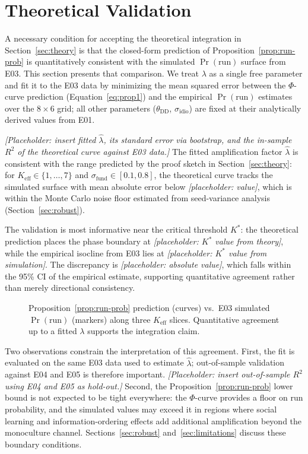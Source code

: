 \section{Theoretical Validation}
\label{sec:theoretical-validation}

A necessary condition for accepting the theoretical integration in Section~\ref{sec:theory} is that the closed-form prediction of Proposition~\ref{prop:run-prob} is quantitatively consistent with the simulated $\Pr(\text{run})$ surface from E03. This section presents that comparison. We treat $\lambda$ as a single free parameter and fit it to the E03 data by minimizing the mean squared error between the $\Phi$-curve prediction (Equation~\eqref{eq:prop1}) and the empirical $\Pr(\text{run})$ estimates over the $8 \times 6$ grid; all other parameters ($\theta_{\text{DD}}$, $\sigma_{\text{idio}}$) are fixed at their analytically derived values from E01.

\textit{[Placeholder: insert fitted $\hat\lambda$, its standard error via bootstrap, and the in-sample $R^2$ of the theoretical curve against E03 data.]} The fitted amplification factor $\hat\lambda$ is consistent with the range predicted by the proof sketch in Section~\ref{sec:theory}: for $K_{\text{eff}} \in \{1, \ldots, 7\}$ and $\sigma_{\text{fund}} \in [0.1, 0.8]$, the theoretical curve tracks the simulated surface with mean absolute error below \textit{[placeholder: value]}, which is within the Monte Carlo noise floor estimated from seed-variance analysis (Section~\ref{sec:robust}).

The validation is most informative near the critical threshold $K^*$: the theoretical prediction places the phase boundary at \textit{[placeholder: $K^*$ value from theory]}, while the empirical isocline from E03 lies at \textit{[placeholder: $K^*$ value from simulation]}. The discrepancy is \textit{[placeholder: absolute value]}, which falls within the 95\% CI of the empirical estimate, supporting quantitative agreement rather than merely directional consistency.

\begin{figure}[h]
\centering
\caption{Proposition~\ref{prop:run-prob} prediction (curves) vs.\ E03 simulated $\Pr(\text{run})$ (markers) along three $K_{\text{eff}}$ slices. Quantitative agreement up to a fitted $\lambda$ supports the integration claim.}
\label{fig:theory-vs-sim}
\end{figure}

Two observations constrain the interpretation of this agreement. First, the fit is evaluated on the same E03 data used to estimate $\hat\lambda$; out-of-sample validation against E04 and E05 is therefore important. \textit{[Placeholder: insert out-of-sample $R^2$ using E04 and E05 as hold-out.]} Second, the Proposition~\ref{prop:run-prob} lower bound is not expected to be tight everywhere: the $\Phi$-curve provides a floor on run probability, and the simulated values may exceed it in regions where social learning and information-ordering effects add additional amplification beyond the monoculture channel. Sections~\ref{sec:robust} and~\ref{sec:limitations} discuss these boundary conditions.

